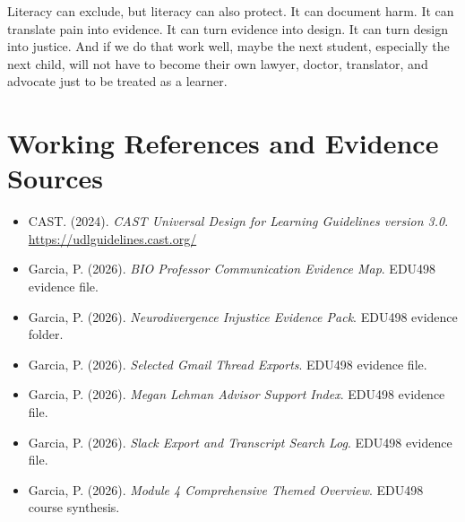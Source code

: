 \documentclass[12pt]{article}
\begin{document}
Literacy can exclude, but literacy can also protect. It can document harm. It can translate pain into evidence. It can turn evidence into design. It can turn design into justice. And if we do that work well, maybe the next student, especially the next child, will not have to become their own lawyer, doctor, translator, and advocate just to be treated as a learner.

\section*{Working References and Evidence Sources}

\begin{itemize}
    \item CAST. (2024). \textit{CAST Universal Design for Learning Guidelines version 3.0}. \url{https://udlguidelines.cast.org/}
    \item Garcia, P. (2026). \textit{BIO Professor Communication Evidence Map}. EDU498 evidence file.
    \item Garcia, P. (2026). \textit{Neurodivergence Injustice Evidence Pack}. EDU498 evidence folder.
    \item Garcia, P. (2026). \textit{Selected Gmail Thread Exports}. EDU498 evidence file.
    \item Garcia, P. (2026). \textit{Megan Lehman Advisor Support Index}. EDU498 evidence file.
    \item Garcia, P. (2026). \textit{Slack Export and Transcript Search Log}. EDU498 evidence file.
    \item Garcia, P. (2026). \textit{Module 4 Comprehensive Themed Overview}. EDU498 course synthesis.
\end{itemize}
\end{document}
